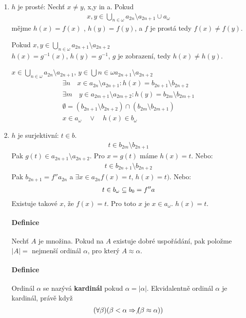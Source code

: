 \documentclass[a4paper,12pt,titlepage]{article}
\begin{document}
\begin{enumerate}

\item $h$ je prosté: Nechť $x\neq y$, x,y in a. Pokud 
\begin{align}
x, y \in \bigcup_{n\in\omega} a_{2n} \setminus a_{2n+1} \cup a_\omega
\end{align}
mějme $h(x) = f(x)$ , $h(y) = f(y)$, a $f$ je prostá tedy $f(x) \neq f(y)$.

Pokud $x,y \in \bigcup_{n\in\omega} a_{2n+1}\setminus a_{2n+2}$ \\
$h(x) = g^{-1}(x)$, $h(y) = g^{-1}$, $g$ je zobrazení, tedy $h(x) \neq h(y)$.

$x \in \bigcup_{n\in\omega} a_{2n} \setminus a_{2n+1}$, $y \in \bigcup{n\in\omega}
a_{2n+1} \setminus a_{2n+2}$
\begin{align}
	\exists n \quad x \in a_{2n} \setminus a_{2n+1}: h(x) = b_{2n+1} \setminus
		b_{2n+2} \\
	\exists m \quad y \in a_{2m+1} \setminus a_{2m+2}: h(y) = b_{2m} \setminus
		b_{2m+1} \\
	\emptyset = (b_{2n+1} \setminus b_{2n+2}) \cap (b_{2m} \setminus b_{2m+1})
	\\
	x \in a_\omega \quad\lor\quad h(x) \in b_\omega
\end{align}

\item $h$ je surjektivní: $t \in b$. \\
\begin{align}
	t \in b_{2m} \setminus b_{2n+1}
\end{align}
Pak $g(t) \in a_{2n+1} \setminus a_{2n+2}$. Pro $x = g(t)$ máme $h(x) = t$.
Nebo:
\begin{align}
	t \in b_{2n+1} \setminus b_{2n+2}
\end{align}
Pak $b_{2n+1} = f''a_{2n}$ a $\exists  x \in a_{2n} f(x) = t$, $h(x) = t)$.
Nebo:
\begin{align}
	t \in b_\omega \subseteq b_0 = f''a
\end{align}
Existuje takové $x$, že $f(x) = t$. Pro toto $x$ je $x \in a_\omega$. $h(x) = t$.
\paragraph{Definice}
Nechť $A$ je množina. Pokud na $A$ existuje dobré uspořádání, pak položme $|A| =$
nejmenší ordinál $\alpha$, pro který $A \approx \alpha$.
\paragraph{Definice}
Ordinál $\alpha$ se nazývá \textbf{kardinál} pokud $\alpha = |\alpha|$.
Ekvidalentně ordinál $\alpha$ je kardinál, právě když 
\begin{align}
	(\forall \beta)(\beta < \alpha \Rightarrow \not (\beta \approx \alpha))
\end{align}

\end{enumerate}
\end{document}
